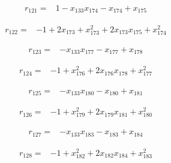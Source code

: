 \documentclass[10pt,letterpaper]{article}
\theoremstyle{remark}\newtheorem{remark}[theorem]{Remark}
\begin{document}
\begin{align*}
r_{121}={}&1-x_{133}x_{174}-x_{174}+x_{175}
\end{align*}

\begin{align*}
r_{122}={}&-1+2x_{173}+x_{173}^{2}+2x_{173}x_{175}+x_{174}^{2}
\end{align*}

\begin{align*}
r_{123}={}&-x_{133}x_{177}-x_{177}+x_{178}
\end{align*}

\begin{align*}
r_{124}={}&-1+x_{176}^{2}+2x_{176}x_{178}+x_{177}^{2}
\end{align*}

\begin{align*}
r_{125}={}&-x_{133}x_{180}-x_{180}+x_{181}
\end{align*}

\begin{align*}
r_{126}={}&-1+x_{179}^{2}+2x_{179}x_{181}+x_{180}^{2}
\end{align*}

\begin{align*}
r_{127}={}&-x_{133}x_{183}-x_{183}+x_{184}
\end{align*}

\begin{align*}
r_{128}={}&-1+x_{182}^{2}+2x_{182}x_{184}+x_{183}^{2}
\end{align*}
\end{document}
